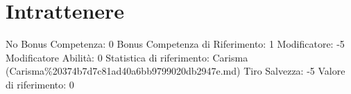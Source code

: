 \section{Intrattenere}\label{intrattenere}

\begin{description}
\tightlist
\item[Tags: ABI]
No Bonus Competenza: 0 Bonus Competenza di Riferimento: 1 Modificatore:
-5 Modificatore Abilità: 0 Statistica di riferimento: Carisma
(Carisma\%20374b7d7c81ad40a6bb9799020db2947e.md) Tiro Salvezza: -5
Valore di riferimento: 0
\end{description}
